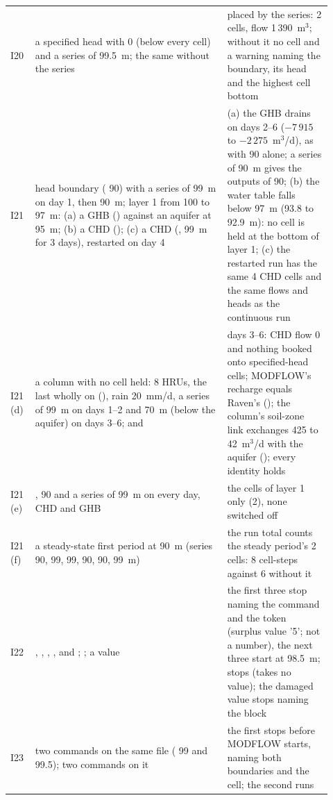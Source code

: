 \begin{longtable}{P{0.07\linewidth}P{0.55\linewidth}P{0.30\linewidth}}
I20 & a specified head with  0 (below every cell) and a  series of 99.5~m; the same without the series & placed by the series: 2 cells, flow 1\,390~m$^3$; without it no cell and a warning naming the boundary, its head and the highest cell bottom\\
I21 & head boundary  ( 90) with a series of 99~m on day 1, then 90~m; layer 1 from 100 to 97~m: (a) a GHB () against an aquifer at 95~m; (b) a CHD (); (c) a CHD (, 99~m for 3 days), restarted on day 4 & (a) the GHB drains on days 2--6 ($-7\,915$ to $-2\,275$~m$^3$/d), as with  90 alone; a series of 90~m gives the outputs of  90; (b) the water table falls below 97~m (93.8 to 92.9~m): no cell is held at the bottom of layer 1; (c) the restarted run has the same 4 CHD cells and the same flows and heads as the continuous run\\
I21 (d) & a column with no cell held: 8 HRUs, the last wholly on  (), rain 20~mm/d, a series of 99~m on days 1--2 and 70~m (below the aquifer) on days 3--6;  and  & days 3--6: CHD flow 0 and nothing booked onto specified-head cells; MODFLOW's recharge equals Raven's (); the column's soil-zone link exchanges 425 to 42~m$^3$/d with the aquifer (); every identity holds\\
I21 (e) & ,  90 and a series of 99~m on every day, CHD and GHB & the cells of layer 1 only (2), none switched off\\
I21 (f) & a steady-state first period at 90~m (series 90, 99, 99, 90, 90, 99~m) & the run total counts the steady period's 2 cells: 8 cell-steps against 6 without it\\
I22 & , , , ,  and ; ; a  value  & the first three stop naming the command and the token (surplus value '5'; not a number), the next three start at 98.5~m;  stops (takes no value); the damaged value stops naming the block\\
I23 & two  commands on the same file ( 99 and 99.5); two  commands on it & the first stops before MODFLOW starts, naming both boundaries and the cell; the second runs\\\bottomrule
\end{longtable}

